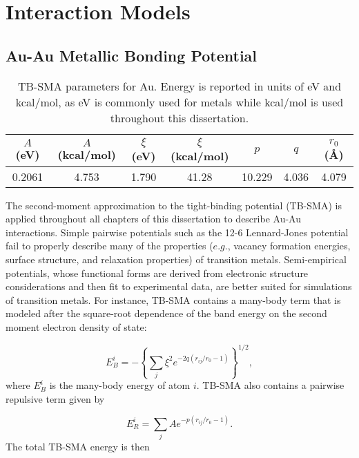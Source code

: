 \documentclass[10pt]{report}  %
\newcommand\findent{\hspace*{\parindent}}
\newcommand{\T}{\rule{0pt}{2.6ex}}
\newcommand{\B}{\rule[-1.2ex]{0pt}{0pt}}
\begin{document}
\section{Interaction Models}

\subsection{Au-Au Metallic Bonding Potential}

%
%
\begin{table} [b] 
\caption{TB-SMA parameters for Au. Energy is reported in units of eV and kcal/mol, as eV is commonly used for metals while kcal/mol is used throughout this dissertation. }
\centering
\begin{tabular}{ c  c  c  c  c  c  c }
	\hline
        \hline
$A$ (eV) \T \B & $A$ (kcal/mol) & $\xi$ (eV)& $\xi$ (kcal/mol) & $p$ & $q$ & $r_{0}$ (\AA) \\
	\hline
0.2061 \T \B & 4.753 & 1.790 & 41.28 & 10.229 & 4.036 & 4.079  \\
	\hline
        \hline
\end{tabular}
\label{table:tbsma-params}
\end{table}

\findent The second-moment approximation to the tight-binding potential (TB-SMA)\cite{Cleri:1993} is applied throughout all chapters of this dissertation to describe Au-Au interactions. Simple pairwise potentials such as the 12-6 Lennard-Jones potential fail to properly describe many of the properties ($e.g.$, vacancy formation energies, surface structure, and relaxation properties) of transition metals.\cite{Cleri:1993} Semi-empirical potentials, whose functional forms are derived from electronic structure considerations and then fit to experimental data, are better suited for simulations of transition metals. For instance, TB-SMA contains a many-body term that is modeled after the square-root dependence of the band energy on the second moment electron density of state:

\begin{equation}E_{B}^{i}=-\left\{\sum_{j}\xi^{2}e^{-2q(r_{ij}/r_{0}-1)}\right\}^{1/2},\label{manybodyterm}
\end{equation} where $E_{B}^{i}$ is the many-body energy of atom $i$. TB-SMA also contains a pairwise repulsive term given by

\begin{equation}E_{R}^{i}=\sum_{j}Ae^{-p(r_{ij}/r_{0}-1)}.\label{pairwiseterm}
\end{equation} The total TB-SMA energy is then
\end{document}
